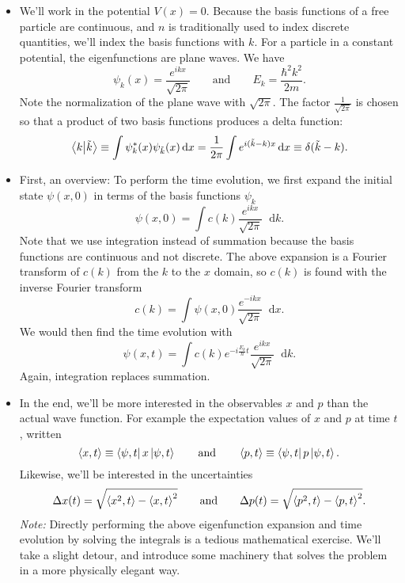 \documentclass[11pt, a4paper]{article}
\newcommand{\diff}{\mathop{}\!\mathrm{d}} %
\newcommand{\eqtext}[1]{\qquad \text{#1} \qquad}
\begin{document}
\begin{itemize}
	\item We'll work in the potential $ V(x) = 0$. Because the basis functions of a free particle are continuous, and $ n $ is traditionally used to index discrete quantities, we'll index the basis functions with $ k $. For a particle in a constant potential, the eigenfunctions are plane waves. We have
	\begin{equation*}
		\psi_{k}(x) = \frac{e^{ikx}}{\sqrt{2\pi}} \eqtext{and} E_{k} = \frac{\hbar^{2}k^{2}}{2m}.
	\end{equation*}
	Note the normalization of the plane wave with $ \sqrt{2\pi} $. The factor $ \frac{1}{\sqrt{2\pi}} $ is chosen so that a product of two basis functions produces a delta function:
	\begin{equation*}
		\braket{k}{\tilde{k}} \equiv \int \psi_{k}^{*}(x)\psi_{\tilde{k}}(x)\diff x = \frac{1}{2\pi} \int e^{i(\tilde{k}-k)x}\diff x \equiv \delta(\tilde{k} - k).
	\end{equation*}
	
	\item First, an overview: To perform the time evolution, we first expand the initial state $ \psi(x, 0) $ in terms of the basis functions $ \psi_{k} $
	\begin{equation*}
		\psi(x, 0) = \int  c(k)\frac{e^{ikx}}{\sqrt{2\pi}} \diff k.
	\end{equation*}
	Note that we use integration instead of summation because the basis functions are continuous and not discrete. The above expansion is a Fourier transform of $ c(k) $ from the $ k $ to the $ x $ domain, so $ c(k) $ is found with the inverse Fourier transform
	\begin{equation*}
		c(k) = \int \psi(x, 0)\frac{e^{-ikx}}{\sqrt{2\pi}}\diff x .
	\end{equation*}
	We would then find the time evolution with
	\begin{equation*}
		\psi(x, t) = \int c(k)e^{-i\frac{E_{k}}{\hbar}t}\frac{e^{ikx}}{\sqrt{2\pi}} \diff k.
	\end{equation*}
	Again, integration replaces summation.
	
	\item In the end, we'll be more interested in the observables $ x $ and $ p $ than the actual wave function. For example the expectation values of $ x $ and $ p $ at time $ t $, written
	\begin{equation*}
		\ev{x, t} \equiv \bra{\psi, t}x\ket{\psi, t} \eqtext{and} \ev{p, t} \equiv \bra{\psi, t}p\ket{\psi, t}.
	\end{equation*}
	Likewise, we'll be interested in the uncertainties
	\begin{equation*}
		\Delta x(t) = \sqrt{\ev{x^{2}, t} - \ev{x, t}^{2}} \eqtext{and} \Delta p(t) = \sqrt{\ev{p^{2}, t} - \ev{p, t}^{2}}.
	\end{equation*}
	\textit{Note:} Directly performing the above eigenfunction expansion and time evolution by solving the integrals is a tedious mathematical exercise. We'll take a slight detour, and introduce some machinery that solves the problem in a more physically elegant way.
\end{itemize}
\end{document}
